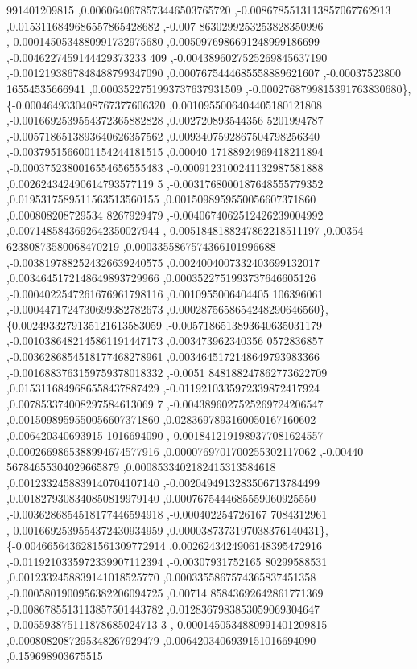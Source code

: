 \begin{DoxyCode}
      991401209815 ,0.0060640678573446503765720 ,-0.0086785513113857067762913 ,0.0153116849686557865428682 ,-0.007
      8630299253253828350996 ,-0.0001450534880991732975680 ,0.0050976986691248999186699 ,-0.0046227459144429373233
      409 ,-0.0043896027525269845637190 ,-0.0012193867848488799347090 ,0.0007675444685558889621607 ,-0.00037523800
      16554535666941 ,0.0003522751993737637931509 ,-0.0002768799815391763830680\},
\{-0.0004649330408767377606320 ,0.0010955006404405180121808 ,-0.0016692539554372365882828 ,0.002720893544356
      5201994787 ,-0.0057186513893640626357562 ,0.0093407592867504798256340 ,-0.0037951566001154244181515 ,0.00040
      17188924969418211894 ,-0.0003752380016554656555483 ,-0.0009123100241132987581888 ,0.002624342490614793577119
      5 ,-0.0031768000187648555779352 ,0.0195317589511563513560155 ,0.0015098959550056607371860 ,0.000808208729534
      8267929479 ,-0.0040674062512426239004992 ,0.0071485843692642350027944 ,-0.0051848188247862218511197 ,0.00354
      62380873580068470219 ,0.0003355867574366101996688 ,-0.0038197882524326639240575 ,0.0024004007332403699132017
       ,0.0034645172148649893729966 ,0.0003522751993737646605126 ,-0.0004022547261676961798116 ,0.0010955006404405
      106396061 ,-0.0004471724730699382782673 ,0.0002875658654248290646560\},
\{0.0024933279135121613583059 ,-0.0057186513893640635031179 ,-0.0010386482145861191447173 ,0.003473962340356
      0572836857 ,-0.0036286854518177468278961 ,0.0034645172148649793983366 ,-0.0016883763159759378018332 ,-0.0051
      848188247862773622709 ,0.0153116849686558437887429 ,-0.0119210335972339872417924 ,0.007853374008297584613069
      7 ,-0.0043896027525269724206547 ,0.0015098959550056607371860 ,0.0283697893160050167160602 ,0.006420340693915
      1016694090 ,-0.0018412191989377081624557 ,0.0002669865388994674577916 ,0.0000769701700255302117062 ,-0.00440
      56784655304029665879 ,0.0008533402182415313584618 ,0.0012332458839140704107140 ,-0.0020494913283506713784499
       ,0.0018279308340850819979140 ,0.0007675444685559060925550 ,-0.0036286854518177446594918 ,-0.000402254726167
      7084312961 ,-0.0016692539554372430934959 ,0.0000387373197038376140431\},
\{-0.0046656436281561309772914 ,0.0026243424906148395472916 ,-0.0119210335972339907112394 ,-0.00307931752165
      80299588531 ,0.0012332458839141018525770 ,0.0003355867574365837451358 ,-0.0005801900956382206094725 ,0.00714
      85843692642861771369 ,-0.0086785513113857501443782 ,0.0128367983853059069304647 ,-0.005593875111878685024713
      3 ,-0.0001450534880991401209815 ,0.0008082087295348267929479 ,0.0064203406939151016694090 ,0.159698903675515

\end{DoxyCode}
